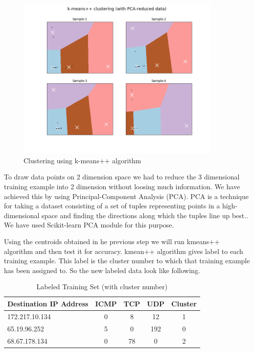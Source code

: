 \documentclass[10pt,oneside,a4paper]{article}
\begin{document}
\begin{figure}[H]
\centering
\includegraphics[width=0.90\textwidth]{kemans-clustering}
\caption{Clustering using k-means++ algorithm} \label{fig:kmeans-clustering}
\end{figure}

To draw data points on 2 dimension space we had to reduce the 3 dimensional training example into 2 dimension without loosing much information. We have achieved this by using Principal-Component Analysis (PCA). PCA is a technique for taking a dataset consisting of a set of tuples representing points in a high-dimensional space and finding the directions along which the tuples line up best.\cite{pca}. We have used Scikit-learn PCA module for this purpose.

Using the centroids obtained in he previous step we will run kmeans++ algorithm and then test it for accuracy. kmean++ algorithm gives label to each training example. This label is the cluster number to which that training example has been assigned to. So the new labeled data look like following.

\begin{table}[H]
\centering
  \begin{tabular}{| l | c | c | c | c |}
    \hline
    {Destination IP Address}  &ICMP  &TCP &UDP  &Cluster \\
    \hline
    172.217.10.134  & 0     & 8     & 12  &1  \\ \hline
    65.19.96.252    & 5     & 0     & 192 &0  \\ \hline
    68.67.178.134   & 0     & 78    & 0   &2  \\ \hline
  \end{tabular}
\caption{Labeled Training Set (with cluster number)} \label{table:labeled-set}
\end{table}
\end{document}
